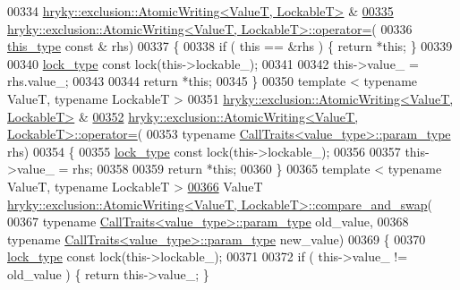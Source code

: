 \begin{DoxyCode}
{{{00334 \hyperlink{classhryky_1_1exclusion_1_1_atomic_writing}{hryky::exclusion::AtomicWriting<ValueT, LockableT>} & 
\hypertarget{exclusion__atomic_8h_source_l00335}{}\hyperlink{group__exclusion__control_ga4e15c7309396df54b08bf6d62c91ea98}{00335} \hyperlink{classhryky_1_1exclusion_1_1_atomic_writing}{hryky::exclusion::AtomicWriting<ValueT, LockableT>::operator=}(
00336     \hyperlink{classhryky_1_1exclusion_1_1_atomic_writing}{this_type} \textcolor{keyword}{const} & rhs)
00337 \{
00338     \textcolor{keywordflow}{if} ( \textcolor{keyword}{this} == &rhs ) \{ \textcolor{keywordflow}{return} *\textcolor{keyword}{this}; \}
00339     
00340     \hyperlink{classhryky_1_1exclusion_1_1_lock}{lock_type} \textcolor{keyword}{const} lock(this->lockable\_);
00341 
00342     this->value\_ = rhs.value\_;
00343 
00344     \textcolor{keywordflow}{return} *\textcolor{keyword}{this};
00345 \}
00350 \textcolor{keyword}{template} < \textcolor{keyword}{typename} ValueT, \textcolor{keyword}{typename} LockableT >
00351 \hyperlink{classhryky_1_1exclusion_1_1_atomic_writing}{hryky::exclusion::AtomicWriting<ValueT, LockableT>} & 
\hypertarget{exclusion__atomic_8h_source_l00352}{}\hyperlink{group__exclusion__control_ga593ba1b3b563f04eeac4e468b77f7009}{00352} \hyperlink{classhryky_1_1exclusion_1_1_atomic_writing}{hryky::exclusion::AtomicWriting<ValueT, LockableT>::operator=}(
00353     \textcolor{keyword}{typename} \hyperlink{classhryky_1_1_call_traits}{CallTraits<value_type>::param_type} rhs)
00354 \{
00355     \hyperlink{classhryky_1_1exclusion_1_1_lock}{lock_type} \textcolor{keyword}{const} lock(this->lockable\_);
00356 
00357     this->value\_ = rhs;
00358 
00359     \textcolor{keywordflow}{return} *\textcolor{keyword}{this};
00360 \}
00365 \textcolor{keyword}{template} < \textcolor{keyword}{typename} ValueT, \textcolor{keyword}{typename} LockableT >
\hypertarget{exclusion__atomic_8h_source_l00366}{}\hyperlink{group__exclusion__control_gac693764e6a7a576464f5a48e3d9816d6}{00366} ValueT \hyperlink{classhryky_1_1exclusion_1_1_atomic_writing}{hryky::exclusion::AtomicWriting<ValueT, LockableT>::compare_and_swap}(
00367     \textcolor{keyword}{typename} \hyperlink{classhryky_1_1_call_traits}{CallTraits<value_type>::param_type} old\_value,
00368     \textcolor{keyword}{typename} \hyperlink{classhryky_1_1_call_traits}{CallTraits<value_type>::param_type} new\_value)
00369 \{
00370     \hyperlink{classhryky_1_1exclusion_1_1_lock}{lock_type} \textcolor{keyword}{const} lock(this->lockable\_);
00371 
00372     \textcolor{keywordflow}{if} ( this->value\_ != old\_value ) \{ \textcolor{keywordflow}{return} this->value\_; \}
}}}
\end{DoxyCode}
